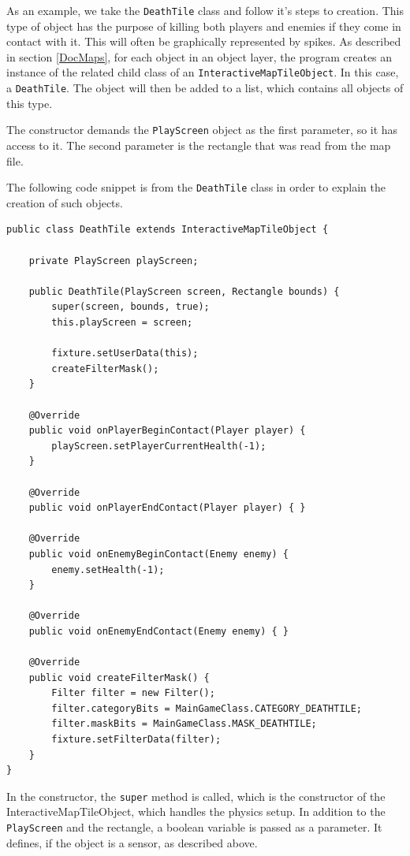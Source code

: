 \documentclass[12p]{article}
\begin{document}
As an example, we take the \texttt{DeathTile} class and follow it's steps to creation. This type of object has the purpose of killing both players and enemies if they come in contact with it. This will often be graphically represented by spikes. As described in section \ref{DocMaps}, for each object in an object layer, the program creates an instance of the related child class of an \texttt{InteractiveMapTileObject}. In this case, a \texttt{DeathTile}. The object will then be added to a list, which contains all objects of this type.


The constructor demands the \texttt{PlayScreen} object as the first parameter, so it has access to it. The second parameter is the rectangle that was read from the map file.

The following code snippet is from the \texttt{DeathTile} class in order to explain the creation of such objects.

\begin{verbatim}
public class DeathTile extends InteractiveMapTileObject {

    private PlayScreen playScreen;

    public DeathTile(PlayScreen screen, Rectangle bounds) {
        super(screen, bounds, true);
        this.playScreen = screen;

        fixture.setUserData(this);
        createFilterMask();
    }

    @Override
    public void onPlayerBeginContact(Player player) {
        playScreen.setPlayerCurrentHealth(-1);
    }

    @Override
    public void onPlayerEndContact(Player player) { }

    @Override
    public void onEnemyBeginContact(Enemy enemy) {
        enemy.setHealth(-1);
    }

    @Override
    public void onEnemyEndContact(Enemy enemy) { }

    @Override
    public void createFilterMask() {
        Filter filter = new Filter();
        filter.categoryBits = MainGameClass.CATEGORY_DEATHTILE;
        filter.maskBits = MainGameClass.MASK_DEATHTILE;
        fixture.setFilterData(filter);
    }
}
\end{verbatim}

In the constructor, the \texttt{super} method is called, which is the constructor of the InteractiveMapTileObject, which handles the physics setup. In addition to the \texttt{PlayScreen} and the rectangle, a boolean variable is passed as a parameter. It defines, if the object is a sensor, as described above.
\end{document}
